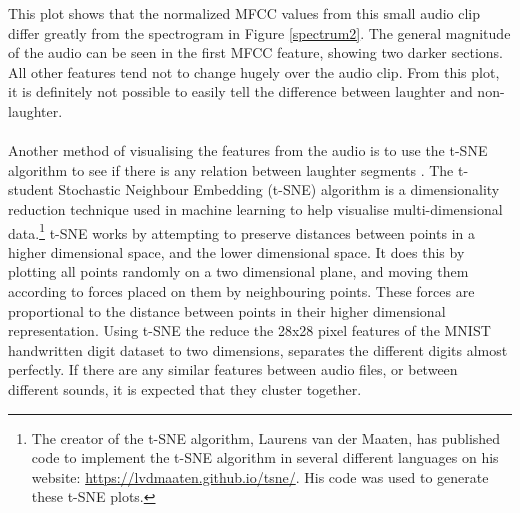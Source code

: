 \documentclass[a4paper,11pt,notitlepage]{article}
\begin{document}
\noindent
This plot shows that the normalized MFCC values from this small audio clip differ greatly from the spectrogram in Figure \ref{spectrum2}. The general magnitude of the audio can be seen in the first MFCC feature, showing two darker sections. All other features tend not to change hugely over the audio clip. From this plot, it is definitely not possible to easily tell the difference between laughter and non-laughter.\\
\\

\noindent
Another method of visualising the features from the audio is to use the t-SNE algorithm to see if there is any relation between laughter segments \cite{maaten2008visualizing}. The t-student Stochastic Neighbour Embedding (t-SNE) algorithm is a dimensionality reduction technique used in machine learning to help visualise multi-dimensional data.\footnote{The creator of the t-SNE algorithm, Laurens van der Maaten, has published code to implement the t-SNE algorithm in several different languages on his website: \url{https://lvdmaaten.github.io/tsne/}. His code was used to generate these t-SNE plots.} t-SNE works by attempting to preserve distances between points in a higher dimensional space, and the lower dimensional space. It does this by plotting all points randomly on a two dimensional plane, and moving them according to forces placed on them by neighbouring points. These forces are proportional to the distance between points in their higher dimensional representation. Using t-SNE the reduce the 28x28 pixel features of the MNIST handwritten digit dataset to two dimensions, separates the different digits almost perfectly. If there are any similar features between audio files, or between different sounds, it is expected that they cluster together.
\end{document}
